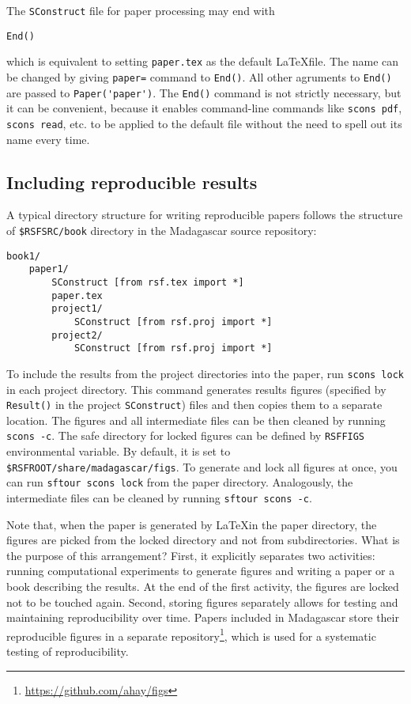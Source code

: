 {{The \texttt{SConstruct} file for paper processing may end with
\begin{verbatim}
End()
\end{verbatim}
which is equivalent to setting \texttt{paper.tex} as the default
\LaTeX file. The name can be changed by giving \texttt{paper=} command
to \texttt{End()}. All other agruments to \texttt{End()} are passed to
  \verb#Paper('paper')#. The \texttt{End()} command is not strictly
  necessary, but it can be convenient, because it enables command-line
  commands like \texttt{scons pdf}, \texttt{scons read}, etc. to be
  applied to the default file without the need to spell out its name
  every time.

\subsection{Including reproducible results}

A typical directory structure for writing reproducible papers follows the structure of \texttt{\$RSFSRC/book} directory in the Madagascar source repository:
\begin{verbatim}
book1/
    paper1/
        SConstruct [from rsf.tex import *]
        paper.tex
        project1/
            SConstruct [from rsf.proj import *]
        project2/
            SConstruct [from rsf.proj import *]
\end{verbatim}
To include the results from the project directories into the paper,
run \texttt{scons lock} in each project directory. This command
generates results figures (specified by \texttt{Result()} in the
project \texttt{SConstruct}) files and then copies them to a separate
location. The figures and all intermediate files can be then cleaned
by running \texttt{scons -c}. The safe directory for locked figures
can be defined by \texttt{RSFFIGS} environmental variable. By default,
it is set to \texttt{\$RSFROOT/share/madagascar/figs}. To generate and
lock all figures at once, you can run \texttt{sftour scons lock} from
the paper directory. Analogously, the intermediate files can be
cleaned by running \texttt{sftour scons -c}.
  
Note that, when the paper is generated by \LaTeX in the paper
directory, the figures are picked from the locked directory and not
from subdirectories. What is the purpose of this arrangement? First,
it explicitly separates two activities: running computational
experiments to generate figures and writing a paper or a book
describing the results. At the end of the first activity, the figures
are locked not to be touched again. Second, storing figures separately
allows for testing and maintaining reproducibility over time. Papers
included in Madagascar store their reproducible figures in a separate
repository\footnote{\url{https://github.com/ahay/figs}}, which is used
for a systematic testing of reproducibility.

}}
